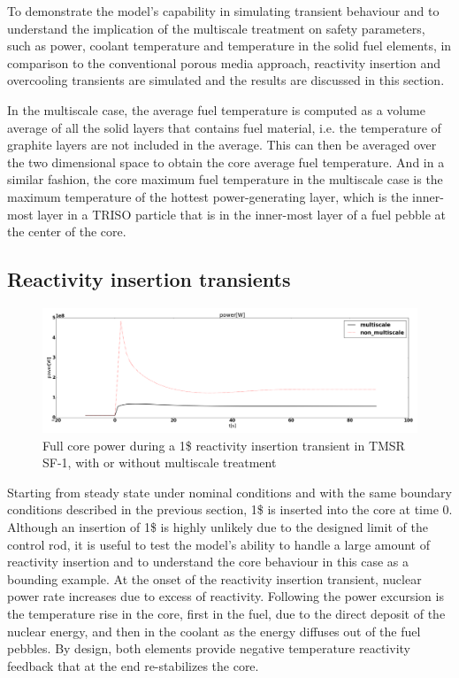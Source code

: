 \documentclass{elsarticle}
\begin{document}
To demonstrate the model's capability in simulating transient behaviour and to understand the implication of the multiscale treatment on safety parameters, such as power, coolant temperature and temperature in the solid fuel elements, in comparison to the conventional porous media approach, reactivity insertion and overcooling transients are simulated and the results are discussed in this section. 

In the multiscale case, the average fuel temperature is computed as a volume average of all the solid layers that contains fuel material, i.e. the temperature of graphite layers are not included in the average. This can then be averaged over the two dimensional space to obtain the core average fuel temperature. And in a similar fashion, the core maximum fuel temperature in the multiscale case is the maximum temperature of the hottest power-generating layer, which is the inner-most layer in a TRISO particle that is in the inner-most layer of a fuel pebble at the center of the core. 



\subsection{Reactivity insertion transients}
\begin{figure}
    \centering
    \includegraphics[width=\textwidth]{images/diffusion/tmsr/RI/compare_multiscale/power.png}
    \caption{Full core power during a 1\$ reactivity insertion transient in TMSR SF-1, with or without multiscale treatment}
    \label{fig:multi_comp_power_TMSR}
\end{figure}



Starting from steady state under nominal conditions and with the same boundary conditions described in the previous section, 1\$ is inserted into the core at time 0. Although an insertion of 1\$ is highly unlikely due to the designed limit of the control rod, it is useful to test the model's ability to handle a large amount of reactivity insertion and to understand the core behaviour in this case as a bounding example. At the onset of the reactivity insertion transient, nuclear power rate increases due to excess of reactivity. Following the power excursion is the temperature rise in the core, first in the fuel, due to the direct deposit of the nuclear energy, and then in the coolant as the energy diffuses out of the fuel pebbles. By design, both elements provide negative temperature reactivity feedback that at the end re-stabilizes the core. 
\end{document}
